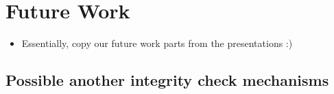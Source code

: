 \section{Future Work}

\begin{itemize}
\item Essentially, copy our future work parts from the presentations :)
\end{itemize}

\subsection{Possible another integrity check mechanisms}